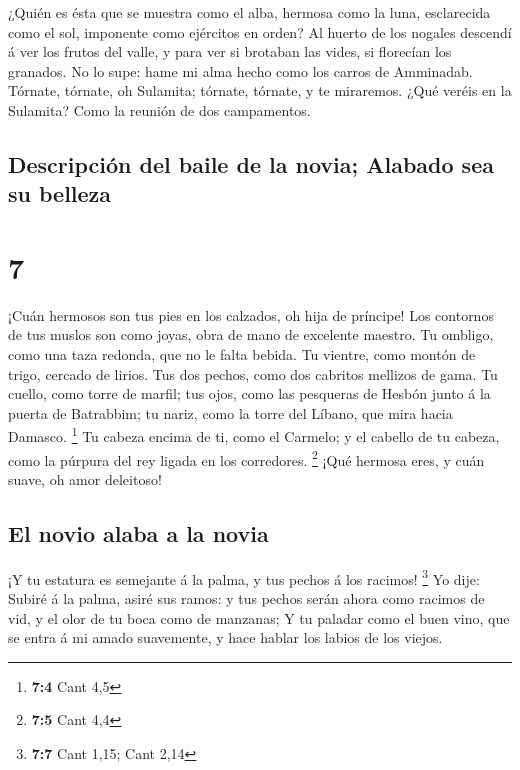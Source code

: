  ¿Quién es ésta que se muestra como el alba, hermosa como
la luna, esclarecida como el sol, imponente como ejércitos en orden?
 Al huerto de los nogales descendí á ver los frutos del
valle, y para ver si brotaban las vides, si florecían los granados.
 No lo supe: hame mi alma hecho como los carros de
Amminadab.  Tórnate, tórnate, oh Sulamita; tórnate,
tórnate, y te miraremos. ¿Qué veréis en la Sulamita? Como la reunión de
dos campamentos.

\hypertarget{descripciuxf3n-del-baile-de-la-novia-alabado-sea-su-belleza}{%
\subsection{Descripción del baile de la novia; Alabado sea su
belleza}\label{descripciuxf3n-del-baile-de-la-novia-alabado-sea-su-belleza}}

\hypertarget{section-6}{%
\section{7}\label{section-6}}

 ¡Cuán hermosos son tus pies en los calzados, oh hija de
príncipe! Los contornos de tus muslos son como joyas, obra de mano de
excelente maestro.  Tu ombligo, como una taza redonda, que
no le falta bebida. Tu vientre, como montón de trigo, cercado de lirios.
 Tus dos pechos, como dos cabritos mellizos de gama.
 Tu cuello, como torre de marfil; tus ojos, como las
pesqueras de Hesbón junto á la puerta de Batrabbim; tu nariz, como la
torre del Líbano, que mira hacia Damasco. \footnote{\textbf{7:4} Cant
  4,5}  Tu cabeza encima de ti, como el Carmelo; y el
cabello de tu cabeza, como la púrpura del rey ligada en los corredores.
\footnote{\textbf{7:5} Cant 4,4}  ¡Qué hermosa eres, y cuán
suave, oh amor deleitoso!

\hypertarget{el-novio-alaba-a-la-novia}{%
\subsection{El novio alaba a la novia}\label{el-novio-alaba-a-la-novia}}

 ¡Y tu estatura es semejante á la palma, y tus pechos á los
racimos! \footnote{\textbf{7:7} Cant 1,15; Cant 2,14}  Yo
dije: Subiré á la palma, asiré sus ramos: y tus pechos serán ahora como
racimos de vid, y el olor de tu boca como de manzanas;  Y tu
paladar como el buen vino, que se entra á mi amado suavemente, y hace
hablar los labios de los viejos.


